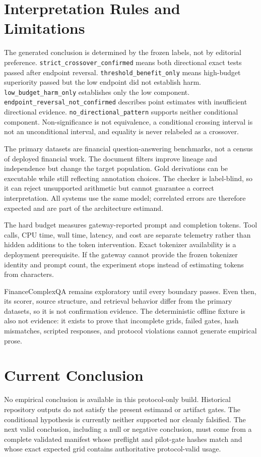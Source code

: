 \section{Interpretation Rules and Limitations}

The generated conclusion is determined by the frozen labels, not by editorial
preference. \nolinkurl{strict_crossover_confirmed} means both directional exact
tests passed after endpoint reversal. \nolinkurl{threshold_benefit_only} means
high-budget superiority passed but the low endpoint did not establish harm.
\nolinkurl{low_budget_harm_only} establishes only the low component.
\nolinkurl{endpoint_reversal_not_confirmed} describes point estimates with
insufficient directional evidence. \nolinkurl{no_directional_pattern} supports
neither conditional component. Non-significance is not equivalence, a
conditional crossing interval is not an unconditional interval, and equality
is never relabeled as a crossover.

The primary datasets are financial question-answering benchmarks, not a census
of deployed financial work. The document filters improve lineage and
independence but change the target population. Gold derivations can be
executable while still reflecting annotation choices. The checker is
label-blind, so it can reject unsupported arithmetic but cannot guarantee a
correct interpretation. All systems use the same model; correlated errors are
therefore expected and are part of the architecture estimand.

The hard budget measures gateway-reported prompt and completion tokens. Tool
calls, CPU time, wall time, latency, and cost are separate telemetry rather than
hidden additions to the token intervention. Exact tokenizer availability is a
deployment prerequisite. If the gateway cannot provide the frozen tokenizer
identity and prompt count, the experiment stops instead of estimating tokens
from characters.

FinanceComplexQA remains exploratory until every boundary passes. Even then,
its scorer, source structure, and retrieval behavior differ from the primary
datasets, so it is not confirmation evidence. The deterministic offline fixture
is also not evidence: it exists to prove that incomplete grids, failed gates,
hash mismatches, scripted responses, and protocol violations cannot generate
empirical prose.

\section{Current Conclusion}

No empirical conclusion is available in this protocol-only build. Historical
repository outputs do not satisfy the present estimand or artifact gates. The
conditional hypothesis is currently neither supported nor cleanly falsified.
The next valid conclusion, including a null or negative conclusion, must come
from a complete validated manifest whose preflight and pilot-gate hashes match
and whose exact expected grid contains authoritative protocol-valid usage.
